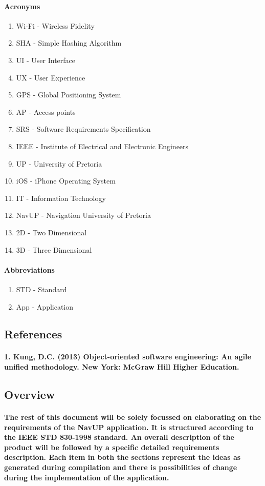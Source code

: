 \documentclass[runningheads,a4paper]{llncs}
\begin{document}
\paragraph{\textbf{Acronyms}}
\begin{enumerate}
	\item Wi-Fi - Wireless Fidelity 
	\item SHA - Simple Hashing Algorithm
	\item UI - User Interface
	\item UX - User Experience
	\item GPS - Global Positioning System
	\item AP - Access points
	\item SRS - Software Requirements Specification
	\item IEEE - Institute of Electrical and Electronic Engineers 
	\item UP - University of Pretoria
	\item iOS - iPhone Operating System 
	\item IT - Information Technology
	\item NavUP - Navigation University of Pretoria
	\item 2D - Two Dimensional
	\item 3D - Three Dimensional
\end{enumerate}

\paragraph{\textbf{Abbreviations}}
\begin{enumerate}
	\item STD - Standard
	\item App - Application
\end{enumerate}

\subsection{References}
\paragraph{1. Kung, D.C. (2013) Object-oriented software engineering: An agile unified methodology. New York: McGraw Hill Higher Education.}
\subsection{Overview}
\paragraph*{The rest of this document will be solely focussed on elaborating on the requirements of the NavUP application. It is structured according to the IEEE STD 830-1998 standard. An overall description of the product will be followed by a specific detailed requirements description. Each item in both the sections represent the ideas as generated during compilation and there is possibilities of change during the implementation of the application.}
\end{document}
